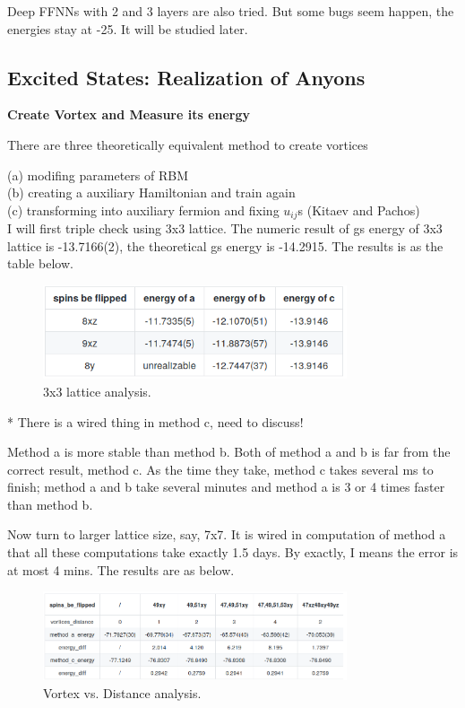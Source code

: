 \documentclass{article}
\begin{document}
Deep FFNNs with 2 and 3 layers are also tried. But some bugs seem happen, the energies stay at -25. It will be studied later.

\subsection{Excited States: Realization of Anyons}

\textbf{Create Vortex and Measure its energy}

There are three theoretically equivalent method to create vortices

    (a) modifing parameters of RBM \\
    (b) creating a auxiliary Hamiltonian and train again \\
    (c) transforming into auxiliary fermion and fixing $u_{ij}$s (Kitaev and Pachos) \\
    
I will first triple check using 3x3 lattice. The numeric result of gs energy of 3x3 lattice is -13.7166(2), the theoretical gs energy is -14.2915. The results is as the table below.

\begin{figure}[!htb]
	\centering
	\includegraphics[width=0.8\textwidth]{./images/3x3.png}
	\caption{\label{tab:3x3} 3x3 lattice analysis.} 
\end{figure}

* There is a wired thing in method c, need to discuss!

Method a is more stable than method b. Both of method a and b is far from the correct result, method c. As the time they take, method c takes several ms to finish; method a and b take several minutes and method a is 3 or 4 times faster than method b.

Now turn to larger lattice size, say, 7x7. It is wired in computation of method a that all these computations take exactly 1.5 days. By exactly, I means the error is at most 4 mins. The results are as below.

\begin{figure}[!htb]
	\centering
	\includegraphics[width=0.8\textwidth]{./images/vort_dis.png}
	\caption{\label{tab:vort_dis} Vortex vs. Distance analysis.} 
\end{figure}
\end{document}
